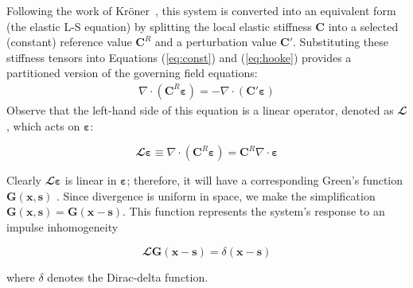 \documentclass[3p, preprint]{elsarticle}
\newcommand{\bmeps}{\bm{\varepsilon}}
\newcommand{\bmx}{\bm{x}}
\newcommand{\bms}{\bm{s}}
\newcommand{\Gop}{\bm{G}}
\newcommand{\Linop}{\mathbfcal{L}}
\newcommand{\Kroner}{Kröner}
\newenvironment{revision} {} {}
\begin{document}
Following the work of \Kroner ~\cite{kroner1972}, this system is converted \begin{revision} into an equivalent form (the elastic L-S equation)\end{revision} by splitting the local elastic stiffness $\bm{C}$ into a selected (constant) reference value $\bm{C}^R$ and a perturbation value $\bm{C}'$. Substituting \begin{revision} these stiffness tensors into Equations (\ref{eq:const}) and (\ref{eq:hooke}) \end{revision} provides a partitioned version of the governing field equations:
\begin{align}
    \nabla \cdot (\bm{C}^R \bmeps) = - \nabla \cdot (\bm{C}' \bmeps) 
    \label{eq:Hookesplit}
\end{align}
\noindent
\begin{revision}
Observe that the left-hand side of this equation is a linear operator, denoted as $\Linop$, which acts on $\bmeps$:

\begin{equation}
   \Linop \bmeps \equiv \nabla \cdot (\bm{C}^R \bmeps) = \bm{C}^R \nabla \cdot  \bmeps
\end{equation} 

\noindent Clearly $\Linop \bmeps$ is linear in $\bmeps$; therefore, it will have a corresponding Green's function $\Gop(\bmx, \bms)$ \cite{green1828_essay}. Since divergence is uniform in space, we make the simplification $\Gop(\bmx, \bms) = \Gop(\bmx - \bms)$. This function represents the system's response to an impulse inhomogeneity  

\begin{equation}
    \Linop \Gop(\bmx - \bms) = \delta(\bmx - \bms)
\end{equation}

\noindent where $\delta$ denotes the Dirac-delta function.\end{revision} 
\end{document}
